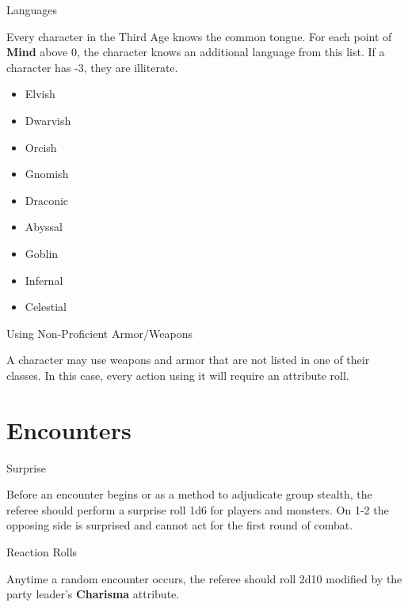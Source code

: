 \documentclass[18pt]{article}
\begin{document}
\begin{multicols}{2}
\begin{mercHeading}
Languages
\end{mercHeading}

Every character in the Third Age knows the common tongue. For each point of \textbf{Mind} above 0, the character knows an additional language from this list. If a character has -3, they are illiterate. 
\begin{itemize}
\setlength\itemsep{0em}
	\item Elvish
	\item Dwarvish
	\item Orcish
	\item Gnomish
	\item Draconic
	\item Abyssal
	\item Goblin
	\item Infernal
	\item Celestial
\end{itemize}

\begin{mercHeading}
Using Non-Proficient Armor/Weapons
\end{mercHeading}
A character may use weapons and armor that are not listed in one of their classes. In this case, every action using it will require an attribute roll.
\section*{Encounters}%
\begin{mercHeading}
Surprise
\end{mercHeading}

Before an encounter begins or as a method to adjudicate group stealth, the referee should perform a surprise roll 1d6 for players and monsters. On 1-2 the opposing side is surprised and cannot act for the first round of combat.

\begin{mercHeading}
Reaction Rolls
\end{mercHeading}
Anytime a random encounter occurs, the referee should roll 2d10 modified by the party leader's \textbf{Charisma} attribute.%
\begin{table}[H]

\begin{center}
\Large
{}
\begin{tabular}{ c  c  }



\end{tabular}
\end{center}
\end{table}
\end{multicols}
\end{document}
